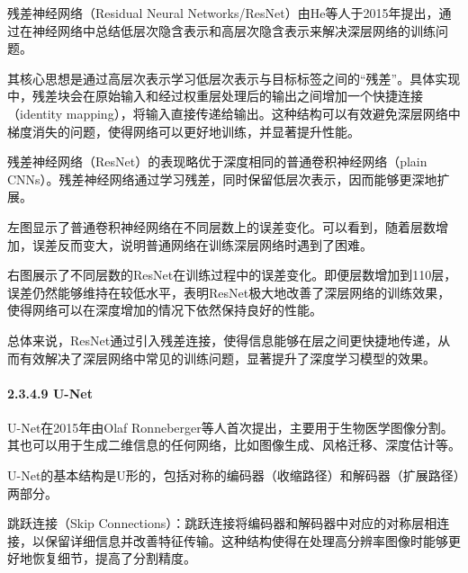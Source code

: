 残差神经网络（Residual Neural
Networks/ResNet）由He等人于2015年提出，通过在神经网络中总结低层次隐含表示和高层次隐含表示来解决深层网络的训练问题。

其核心思想是通过高层次表示学习低层次表示与目标标签之间的``残差''。具体实现中，残差块会在原始输入和经过权重层处理后的输出之间增加一个快捷连接（identity
mapping），将输入直接传递给输出。这种结构可以有效避免深层网络中梯度消失的问题，使得网络可以更好地训练，并显著提升性能。


残差神经网络（ResNet）的表现略优于深度相同的普通卷积神经网络（plain
CNNs）。残差神经网络通过学习残差，同时保留低层次表示，因而能够更深地扩展。


左图显示了普通卷积神经网络在不同层数上的误差变化。可以看到，随着层数增加，误差反而变大，说明普通网络在训练深层网络时遇到了困难。

右图展示了不同层数的ResNet在训练过程中的误差变化。即便层数增加到110层，误差仍然能够维持在较低水平，表明ResNet极大地改善了深层网络的训练效果，使得网络可以在深度增加的情况下依然保持良好的性能。

总体来说，ResNet通过引入残差连接，使得信息能够在层之间更快捷地传递，从而有效解决了深层网络中常见的训练问题，显著提升了深度学习模型的效果。

\paragraph{\texorpdfstring{\textbf{2.3.4.9
U-Net}}{2.3.4.9 U-Net}}\label{2349-u-net}

U-Net在2015年由Olaf
Ronneberger等人首次提出，主要用于生物医学图像分割。其也可以用于生成二维信息的任何网络，比如图像生成、风格迁移、深度估计等。


U-Net的基本结构是U形的，包括对称的编码器（收缩路径）和解码器（扩展路径）两部分。

跳跃连接（Skip
Connections）：跳跃连接将编码器和解码器中对应的对称层相连接，以保留详细信息并改善特征传输。这种结构使得在处理高分辨率图像时能够更好地恢复细节，提高了分割精度。


